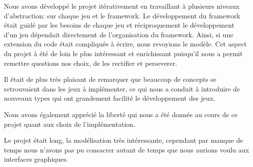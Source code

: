\documentclass[a4paper, 11pt, DIV=9]{scrartcl}
\begin{document}
Nous avons développé le projet itérativement en travaillant à plusieurs niveaux
d'abstraction: sur chaque jeu et le framework. Le développement du framework
était guidé par les besoins de chaque jeu et réciproquement le développement
d'un jeu dépendait directement de l'organisation du framework. Ainsi, si une
extension du code était compliquée à écrire, nous revoyions le modèle. 
Cet aspect du projet à été de loin le plus intéressant et enrichissant puisqu'il
nous a permit remettre questions nos choix, de les rectifier et perseverer.

Il était de plus très plaisant de remarquer que beaucoup de concepts se
retrouvaient dans les jeux à implémenter, ce qui nous a conduit à introduire de
nouveaux types qui ont grandement facilité le développement des jeux.

Nous avons également apprécié la liberté qui nous a été donnée au cours de ce projet
quant aux choix de l'implémentation.

Le projet était long, la modélisation très intéressante, cependant par manque de
temps nous n'avons pas pu consacrer autant de temps que nous aurions voulu aux interfaces graphiques.
\end{document}
